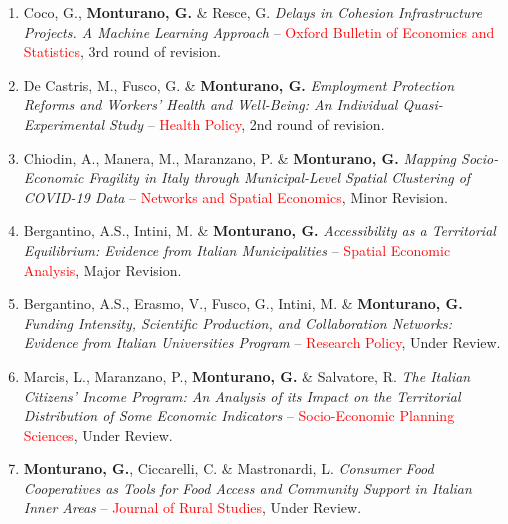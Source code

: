 \documentclass[11pt,a4paper,sans]{moderncv} %
\begin{document}
\begin{enumerate}


\item Coco, G., \textbf{Monturano, G.} \& Resce, G.
\textit{Delays in Cohesion Infrastructure Projects.
A Machine Learning Approach}
-- \textcolor{red}{Oxford Bulletin of Economics and Statistics},
3rd round of revision.

\item De Castris, M., Fusco, G. \& \textbf{Monturano, G.}
\textit{Employment Protection Reforms and Workers'
Health and Well-Being: An Individual Quasi-Experimental Study}
-- \textcolor{red}{Health Policy},
2nd round of revision.

\item Chiodin, A., Manera, M., Maranzano, P.
\& \textbf{Monturano, G.}
\textit{Mapping Socio-Economic Fragility in Italy through
Municipal-Level Spatial Clustering of COVID-19 Data}
-- \textcolor{red}{Networks and Spatial Economics},
Minor Revision.



\item Bergantino, A.S., Intini, M.
\& \textbf{Monturano, G.}
\textit{Accessibility as a Territorial Equilibrium:
Evidence from Italian Municipalities}
-- \textcolor{red}{Spatial Economic Analysis},
Major Revision.



\item Bergantino, A.S., Erasmo, V., Fusco, G.,
Intini, M. \& \textbf{Monturano, G.}
\textit{Funding Intensity, Scientific Production,
and Collaboration Networks:
Evidence from Italian Universities Program}
-- \textcolor{red}{Research Policy},
Under Review.

\item Marcis, L., Maranzano, P.,
\textbf{Monturano, G.} \& Salvatore, R.
\textit{The Italian Citizens' Income Program:
An Analysis of its Impact on the Territorial Distribution
of Some Economic Indicators}
-- \textcolor{red}{Socio-Economic Planning Sciences},
Under Review.

\item \textbf{Monturano, G.}, Ciccarelli, C.
\& Mastronardi, L.
\textit{Consumer Food Cooperatives as Tools for
Food Access and Community Support in Italian Inner Areas}
-- \textcolor{red}{Journal of Rural Studies},
Under Review.


\end{enumerate}
\end{document}
